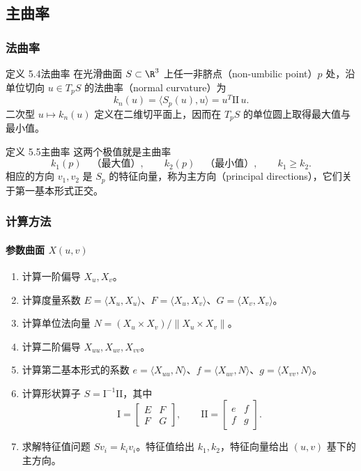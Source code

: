 \subsection{主曲率}
\subsubsection{法曲率}
\begin{statement}{定义 5.4}{法曲率}
在光滑曲面 $S\subset\R^3$ 上任一非脐点（non-umbilic point）$p$ 处，沿单位切向 $u\in T_pS$ 的法曲率（normal curvature）为
\[
  k_n(u)=\langle S_p(u),u\rangle=u^T\mathrm{II}\,u.
\]
二次型 $u\mapsto k_n(u)$ 定义在二维切平面上，因而在 $T_pS$ 的单位圆上取得最大值与最小值。
\end{statement}

\begin{statement}{定义 5.5}{主曲率}
这两个极值就是主曲率
\[
  k_1(p)\quad\text{（最大值）},\qquad k_2(p)\quad\text{（最小值）},
  \qquad k_1\ge k_2.
\]
相应的方向 $v_1,v_2$ 是 $S_p$ 的特征向量，称为主方向（principal directions），它们关于第一基本形式正交。
\end{statement}

\subsubsection{计算方法}
\paragraph{参数曲面 \texorpdfstring{$X(u,v)$}{X(u,v)}}
\begin{enumerate}[label=第 \arabic* 步]
  \item 计算一阶偏导 $X_u,X_v$。
  \item 计算度量系数 $E=\langle X_u,X_u\rangle$、$F=\langle X_u,X_v\rangle$、$G=\langle X_v,X_v\rangle$。
  \item 计算单位法向量 $N=(X_u\times X_v)/\lVert X_u\times X_v\rVert$。
  \item 计算二阶偏导 $X_{uu},X_{uv},X_{vv}$。
  \item 计算第二基本形式的系数 $e=\langle X_{uu},N\rangle$、$f=\langle X_{uv},N\rangle$、$g=\langle X_{vv},N\rangle$。
  \item 计算形状算子 $S=\mathrm I^{-1}\mathrm{II}$，其中
  \[
    \mathrm I=\begin{bmatrix}E&F\\F&G\end{bmatrix},\qquad
    \mathrm{II}=\begin{bmatrix}e&f\\f&g\end{bmatrix}.
  \]
  \item 求解特征值问题 $Sv_i=k_i v_i$。特征值给出 $k_1,k_2$，特征向量给出 $(u,v)$ 基下的主方向。
\end{enumerate}

